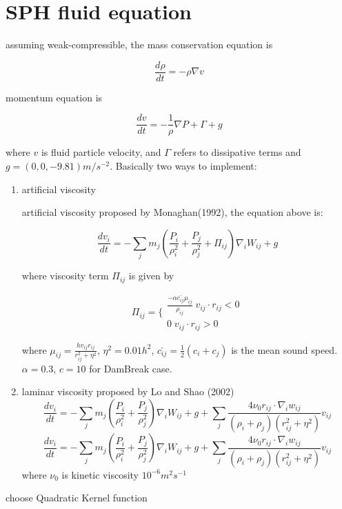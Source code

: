 \documentclass[11pt]{article}
\begin{document}
\section{SPH fluid equation}

assuming weak-compressible, the mass conservation equation is

$$ \frac{d \rho}{dt} = - \rho \nabla  v $$

momentum equation is 

$$ \frac{dv}{dt} = - \frac{1}{\rho} \nabla P + \Gamma + g $$

where $v$ is fluid particle velocity, and $\Gamma$ refers to dissipative terms and $ g=(0,0,-9.81) m/s^{-2} $. Basically two ways to implement:

\begin{enumerate}
\item{artificial viscosity}

artificial viscosity proposed by Monaghan(1992), the equation above is:

$$  \frac{dv_i}{dt} = - \sum_{j} m_j (\frac{P_i}{\rho _i ^2} + \frac{P_j}{\rho_j ^2} + \Pi _{ij} ) \nabla_i W_{ij} + g $$

where viscosity term $\Pi_{ij}$ is given by

$$ \Pi_{ij} = \{ \begin{array}{c} \frac{-\alpha \bar{c_{ij}} \mu_{ij}}{\rho _{ij}} \; v_{ij} \cdot r_{ij} < 0 \\ 0 \;  v_{ij} \cdot r_{ij} > 0 \end{array} $$

where $ \mu_{ij} = \frac{h v_{ij} r_{ij}}{ r_{ij}^2 + \eta ^2} $, $\eta^2 = 0.01 h^2$, $\bar{c_{ij}} = \frac{1}{2}(c_i+c_j)$ is the mean sound speed. $\alpha = 0.3$, $c=10$  for DamBreak case. 

\item{laminar viscosity}
proposed by Lo and Shao (2002)$$  \frac{dv_i}{dt} = - \sum_{j} m_j (\frac{P_i}{\rho _i ^2} + \frac{P_j}{\rho_j ^2}) \nabla_i W_{ij} + g + \sum_{j} \frac{4 \nu_0 r_{ij} \cdot \nabla_i w_{ij}}{(\rho_i + \rho_j)(r_{ij}^2+\eta^2)}v_{ij} $$
$$  \frac{dv_i}{dt} = - \sum_{j} m_j (\frac{P_i}{\rho _i ^2} + \frac{P_j}{\rho_j ^2}) \nabla_i W_{ij} + g + \sum_{j} \frac{4 \nu_0 r_{ij} \cdot \nabla_i w_{ij}}{(\rho_i + \rho_j)(r_{ij}^2+\eta^2)}v_{ij} $$
where $\nu_0$ is kinetic viscosity $ 10^{-6} m^2s^{-1} $

\end{enumerate}

choose Quadratic Kernel function
\end{document}
